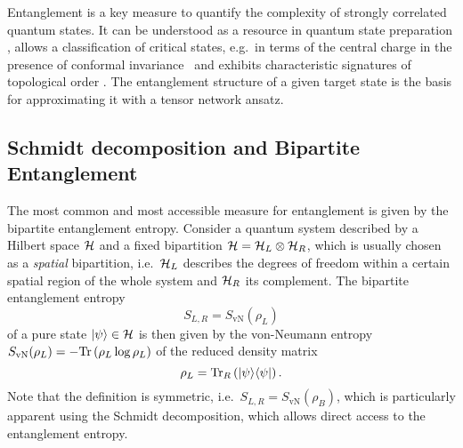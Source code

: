 Entanglement is a key measure to quantify the complexity of strongly correlated quantum states.
%
It can be understood as a resource in quantum state preparation \cite{bennett2001, bennet2014, chitambar2019}, allows a classification of critical states, e.g.~in terms of the central charge in the presence of conformal invariance~\cite{calabrese2008, tagliacozzo2008a, pollmann2009a} and exhibits characteristic signatures of topological order \cite{levin2006, kitaev2006, li2008}.
%
The entanglement structure of a given target state is the basis for approximating it with a tensor network ansatz.
%
\subsection{Schmidt decomposition and Bipartite Entanglement}
%
The most common and most accessible measure for entanglement is given by the bipartite entanglement entropy.
%
Consider a quantum system described by a Hilbert space $\mathcal{H}$ and a fixed bipartition $\mathcal{H} = \mathcal{H}_L \otimes \mathcal{H}_R$, which is usually chosen as a \emph{spatial} bipartition, i.e.~$\mathcal{H}_{L}$ describes the degrees of freedom within a certain spatial region of the whole system and $\mathcal{H}_{R}$ its complement.
%
The bipartite entanglement entropy
\begin{equation}
    \label{eq:tensornets:entanglement:def_bipartite_entropy}
    S_{L,R} = S_\text{vN}(\rho_L)
\end{equation}
of a pure state $\psiket\in\hilbert$ is then given by the von-Neumann entropy $S_\text{vN}(\rho_L) = -\mathrm{Tr}\left( {\rho_L \log \rho_L} \right)$ of the reduced density matrix
\begin{equation}
    \label{eq:tensornets:entanglement:def_RDM}
    \rho_L = \trArg{R}{\ketbra{\psi}{\psi}}.
\end{equation}
Note that the definition is symmetric, i.e.~$S_{L,R} = S_\text{vN}(\rho_B)$, which is particularly apparent using the Schmidt decomposition, which allows direct access to the entanglement entropy.

